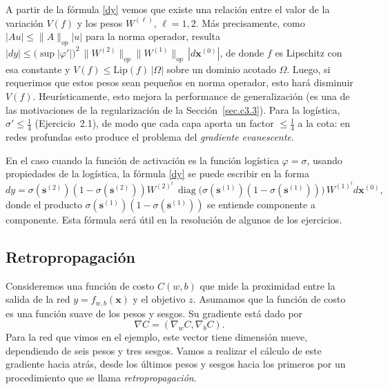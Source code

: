 \documentclass[12pt, a4paper]{amsbook}
\newcommand{\sbf}{{\mathbf s}}
\newcommand{\xx}{{\mathbf x}}
\theoremstyle{remark}
\theoremstyle{definition}
\numberwithin{section}{chapter}
\numberwithin{subsection}{section}
\numberwithin{equation}{section}
\numberwithin{figure}{chapter}
\begin{document}
A partir de la fórmula \eqref{dy} vemos que existe una relación entre el valor de la variación $V(f)$ y los pesos $W^{(\ell)}$, $\ell=1, 2$. Más precisamente, como $|Au|\le\|A\|_{op}|u|$ para la norma operador, resulta $|dy|\le \bigl(\sup|\varphi'|\bigr)^2\,\|W^{(2)}\|_{op}\|W^{(1)}\|_{op}\,|d\xx^{(0)}|$, de donde $f$ es Lipschitz con esa constante y $V(f)\le \mathrm{Lip}(f)\,|\Omega|$ sobre un dominio acotado $\Omega$. Luego, si requerimos que estos pesos sean pequeños en norma operador, esto hará disminuir $V(f)$. Heurísticamente, esto mejora la performance de generalización (es una de las motivaciones de la regularización de la Sección~\ref{sec.c3.3}). Para la logística, $\sigma'\le\frac14$ (Ejercicio~2.1), de modo que cada capa aporta un factor $\le\frac14$ a la cota: en redes profundas esto produce el problema del {\em gradiente evanescente}.

En el caso cuando la función de activación es la función logística $\varphi=\sigma$, usando propiedades de la logística, la fórmula \eqref{dy} se puede escribir en la forma
$$
dy = \sigma(\sbf^{(2)})(1-\sigma(\sbf^{(2)})) W^{(2)^t}\, \operatorname{diag}\bigl(\sigma(\sbf^{(1)})(1-\sigma(\sbf^{(1)}))\bigr)\, W^{(1)^t} d\xx^{(0)},
$$
donde el producto $\sigma(\sbf^{(1)})(1-\sigma(\sbf^{(1)}))$ se entiende componente a componente.
Esta fórmula será útil en la resolución de algunos de los ejercicios.

\subsection{Retropropagación}

Consideremos una función de costo $C(w, b)$ que mide la proximidad entre la salida de la red $y=f_{w, b}(\xx)$ y el objetivo $z$.  Asumamos que la función de costo es una función suave de los pesos y sesgos. Su gradiente está dado por
$$
\nabla C = (\nabla_w C, \nabla_b C).
$$
Para la red que vimos en el ejemplo, este vector tiene dimensión nueve, dependiendo de seis pesos y tres sesgos. Vamos a realizar el cálculo de este gradiente hacia atrás, desde los últimos pesos y sesgos hacia los primeros por un procedimiento que se llama {\em retropropagación}.
\end{document}
